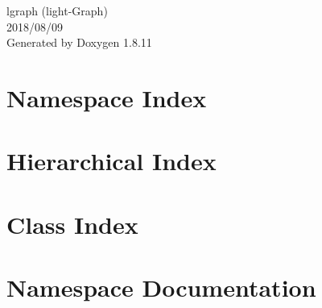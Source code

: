 \documentclass[twoside]{book}
\newcommand{\+}{\discretionary{\mbox{\scriptsize$\hookleftarrow$}}{}{}}
\newcommand{\clearemptydoublepage}{%
  \newpage{\pagestyle{empty}\cleardoublepage}%
}
\begin{document}
\hypersetup{pageanchor=false,
             bookmarksnumbered=true,
             pdfencoding=unicode
            }
\begin{titlepage}
\vspace*{7cm}
\begin{center}%
{\Large lgraph (light-\/\+Graph) \\[1ex]\large 2018/08/09 }\\
\vspace*{1cm}
{\large Generated by Doxygen 1.8.11}\\
\end{center}
\end{titlepage}
\clearemptydoublepage
\tableofcontents
\clearemptydoublepage
{}
\hypersetup{pageanchor=true}

\chapter{Namespace Index}

\chapter{Hierarchical Index}

\chapter{Class Index}

\chapter{Namespace Documentation}















\end{document}
